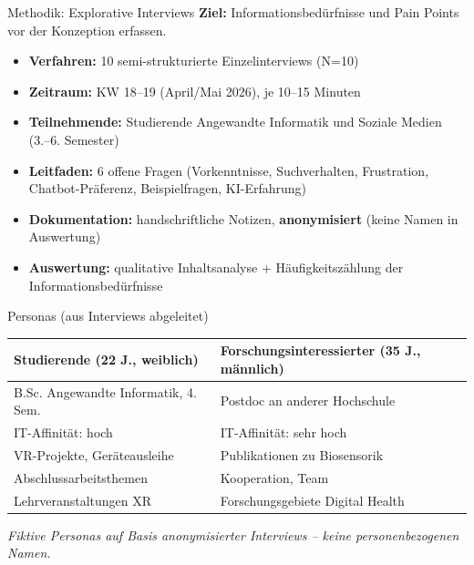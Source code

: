 \documentclass[14pt,aspectratio=169]{beamer}
\begin{document}
\begin{frame}{Methodik: Explorative Interviews}
    \textbf{Ziel:} Informationsbedürfnisse und Pain Points vor der Konzeption erfassen.
    \begin{itemize}
        \item \textbf{Verfahren:} 10 semi-strukturierte Einzelinterviews (N=10)
        \item \textbf{Zeitraum:} KW 18--19 (April/Mai 2026), je 10--15 Minuten
        \item \textbf{Teilnehmende:} Studierende Angewandte Informatik und Soziale Medien (3.--6. Semester)
        \item \textbf{Leitfaden:} 6 offene Fragen (Vorkenntnisse, Suchverhalten, Frustration, Chatbot-Präferenz, Beispielfragen, KI-Erfahrung)
        \item \textbf{Dokumentation:} handschriftliche Notizen, \textbf{anonymisiert} (keine Namen in Auswertung)
        \item \textbf{Auswertung:} qualitative Inhaltsanalyse + Häufigkeitszählung der Informationsbedürfnisse
    \end{itemize}
\end{frame}

\begin{frame}{Personas (aus Interviews abgeleitet)}
    \begin{tabularx}{\textwidth}{X X}
        \toprule
        \textbf{Studierende (22 J., weiblich)} & \textbf{Forschungsinteressierter (35 J., männlich)} \\
        \midrule
        B.Sc. Angewandte Informatik, 4. Sem. & Postdoc an anderer Hochschule \\
        IT-Affinität: hoch & IT-Affinität: sehr hoch \\
        \midrule
        VR-Projekte, Geräteausleihe & Publikationen zu Biosensorik \\
        Abschlussarbeitsthemen & Kooperation, Team \\
        Lehrveranstaltungen XR & Forschungsgebiete Digital Health \\
        \bottomrule
    \end{tabularx}
    \vspace{0.4cm}
    \small\textit{Fiktive Personas auf Basis anonymisierter Interviews -- keine personenbezogenen Namen.}
\end{frame}
\end{document}
